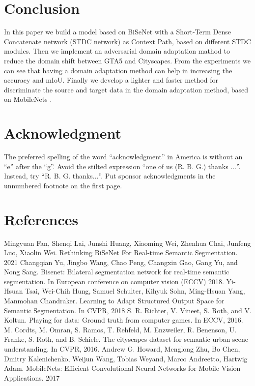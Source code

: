 \documentclass[conference]{IEEEtran}
\begin{document}
\section{Conclusion}

In this paper we build a model based on BiSeNet \cite{b2} with a Short-Term Dense Concatenate network (STDC network) \cite{b1} as Context Path, 
based on different STDC modules. Then we implement an adversarial domain adaptation mathod \cite{b3} to reduce the domain shift between GTA5
and Cityscapes. From the experiments we can see that having a domain adaptation method can help in increasing the accuracy and mIoU. 
Finally we develop a lighter and faster method for discriminate the source and target data in the domain adaptation
method, based on MobileNets \cite{b6}. 

\section*{Acknowledgment}

The preferred spelling of the word ``acknowledgment'' in America is without 
an ``e'' after the ``g''. Avoid the stilted expression ``one of us (R. B. 
G.) thanks $\ldots$''. Instead, try ``R. B. G. thanks$\ldots$''. Put sponsor 
acknowledgments in the unnumbered footnote on the first page.

\section*{References}

\begin{thebibliography}{00}
 Mingyuan Fan, Shenqi Lai, Junshi Huang, Xiaoming Wei, Zhenhua Chai, Junfeng Luo, Xiaolin Wei. Rethinking BiSeNet For Real-time Semantic Segmentation. 2021
 Changqian Yu, Jingbo Wang, Chao Peng, Changxin Gao, Gang Yu, and Nong Sang. Bisenet: Bilateral segmentation network for real-time semantic segmentation. In European conference on computer vision (ECCV) 2018.
 Yi-Hsuan Tsai, Wei-Chih Hung, Samuel Schulter, Kihyuk Sohn, Ming-Hsuan Yang, Manmohan Chandraker. Learning to Adapt Structured Output Space for Semantic Segmentation. In CVPR, 2018
 S. R. Richter, V. Vineet, S. Roth, and V. Koltun. Playing for data: Ground truth from computer games. In ECCV, 2016.
 M. Cordts, M. Omran, S. Ramos, T. Rehfeld, M. Enzweiler, R. Benenson, U. Franke, S. Roth, and B. Schiele. The cityscapes dataset for semantic urban scene understanding. In CVPR, 2016. 
 Andrew G. Howard, Menglong Zhu, Bo Chen, Dmitry Kalenichenko, Weijun Wang, Tobias Weyand, Marco Andreetto, Hartwig Adam. MobileNets: Efficient Convolutional Neural Networks for Mobile Vision Applications. 2017
\end{thebibliography}
\vspace{12pt}
\end{document}
